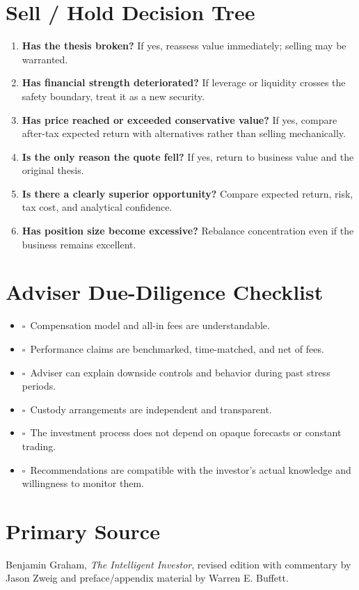 \documentclass[11pt]{article}
\newcommand{\checkbox}{\(\square\)}
\begin{document}
\section{Sell / Hold Decision Tree}
\begin{enumerate}
\item \textbf{Has the thesis broken?} If yes, reassess value immediately; selling may be warranted.
\item \textbf{Has financial strength deteriorated?} If leverage or liquidity crosses the safety boundary, treat it as a new security.
\item \textbf{Has price reached or exceeded conservative value?} If yes, compare after-tax expected return with alternatives rather than selling mechanically.
\item \textbf{Is the only reason the quote fell?} If yes, return to business value and the original thesis.
\item \textbf{Is there a clearly superior opportunity?} Compare expected return, risk, tax cost, and analytical confidence.
\item \textbf{Has position size become excessive?} Rebalance concentration even if the business remains excellent.
\end{enumerate}

\section{Adviser Due-Diligence Checklist}
\begin{itemize}
\item \checkbox\ Compensation model and all-in fees are understandable.
\item \checkbox\ Performance claims are benchmarked, time-matched, and net of fees.
\item \checkbox\ Adviser can explain downside controls and behavior during past stress periods.
\item \checkbox\ Custody arrangements are independent and transparent.
\item \checkbox\ The investment process does not depend on opaque forecasts or constant trading.
\item \checkbox\ Recommendations are compatible with the investor's actual knowledge and willingness to monitor them.
\end{itemize}

\section*{Primary Source}
{\small Benjamin Graham, \textit{The Intelligent Investor}, revised edition with commentary by Jason Zweig and preface/appendix material by Warren E. Buffett.}
\end{document}

